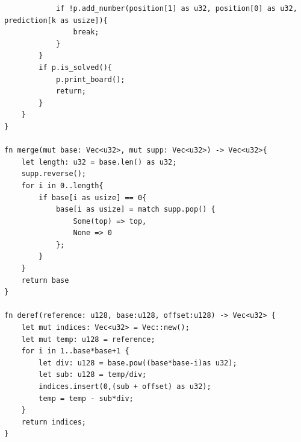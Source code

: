 \documentclass[12pt]{article}
\begin{document}
\begin{verbatim}
            if !p.add_number(position[1] as u32, position[0] as u32, prediction[k as usize]){
                break;
            }
        }
        if p.is_solved(){
            p.print_board();
            return;
        }
    }
}

fn merge(mut base: Vec<u32>, mut supp: Vec<u32>) -> Vec<u32>{
    let length: u32 = base.len() as u32;
    supp.reverse();
    for i in 0..length{
        if base[i as usize] == 0{
            base[i as usize] = match supp.pop() {
                Some(top) => top,
                None => 0
            };
        }
    }
    return base
}

fn deref(reference: u128, base:u128, offset:u128) -> Vec<u32> {
    let mut indices: Vec<u32> = Vec::new();
    let mut temp: u128 = reference;
    for i in 1..base*base+1 {
        let div: u128 = base.pow((base*base-i)as u32);
        let sub: u128 = temp/div;
        indices.insert(0,(sub + offset) as u32);
        temp = temp - sub*div;
    }
    return indices;
}
\end{verbatim}
\clearpage
\end{document}

